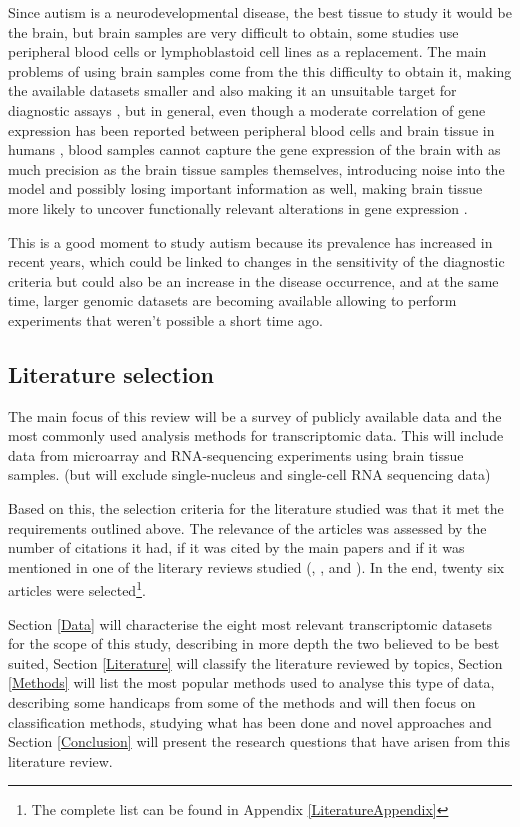 Since autism is a neurodevelopmental disease, the best tissue to study it would be the brain, but  brain samples are very difficult to obtain, some studies use peripheral blood cells or lymphoblastoid cell lines as a replacement. The main problems of using brain samples come from the this difficulty to obtain it, making the available datasets smaller \cite{segura_neurotrophin_2015} and also making it an unsuitable target for diagnostic assays \cite{hu_gene_2006}, but in general, even though a moderate correlation of gene expression has been reported between peripheral blood cells and brain tissue in humans \cite{chien_increased_2013}, blood samples cannot capture the gene expression of the brain with as much precision as the brain tissue samples themselves, introducing noise into the model and possibly losing important information as well, making brain tissue more likely to uncover functionally relevant alterations in gene expression \cite{voineagu_gene_2012}.

This is a good moment to study autism because its prevalence has increased in recent years, which could be linked to changes in the sensitivity of the diagnostic criteria but could also be an increase in the disease occurrence, and at the same time, larger genomic datasets are becoming available allowing to perform experiments that weren't possible a short time ago.

\subsection{Literature selection}
The main focus of this review will be a survey of publicly available data and the most commonly used analysis methods for transcriptomic data. This will include data from microarray and RNA-sequencing experiments using brain tissue samples. (but will exclude single-nucleus and single-cell RNA sequencing data)

Based on this, the selection criteria for the literature studied was that it met the requirements outlined above. The relevance of the articles was assessed by the number of citations it had, if it was cited by the main papers and if it was mentioned in one of the literary reviews studied (\cite{keil_brain_2018}, \cite{voineagu_gene_2012}, \cite{vijayakumar_autism_2016} and \cite{ansel_variation_2017}). In the end, twenty six articles were selected\footnote{The complete list can be found in Appendix \ref{LiteratureAppendix}}.

Section \ref{Data} will characterise the eight most relevant transcriptomic datasets for the scope of this study, describing in more depth the two believed to be best suited, Section \ref{Literature} will classify the literature reviewed by topics, Section \ref{Methods} will list the most popular methods used to analyse this type of data, describing some handicaps from some of the methods and will then focus on classification methods, studying what has been done and novel approaches and Section \ref{Conclusion} will present the research questions that have arisen from this literature review.
